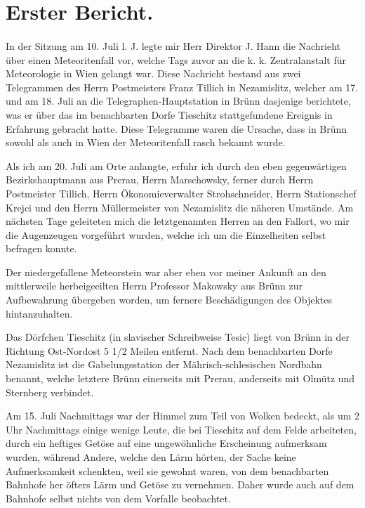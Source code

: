 \documentclass[a4paper, 11pt, oneside]{article}
\begin{document}
\section{Erster Bericht.}
\paragraph{}
In der Sitzung am 10. Juli l. J. legte mir Herr Direktor J. Hann die Nachrieht über einen Meteoritenfall vor, welche Tags zuvor an die k. k. Zentralanstalt für Meteorologie in Wien gelangt war. Diese Nachricht bestand aus zwei Telegrammen des Herrn Postmeisters Franz Tillich in Nezamislitz, welcher am 17. und am 18. Juli an die Telegraphen-Hauptstation in Brünn dasjenige berichtete, was er über das im benachbarten Dorfe Tieschitz stattgefundene Ereignis in Erfahrung gebracht hatte. Diese Telegramme waren die Ursache, dass in Brünn sowohl als auch in Wien der Meteoritenfall rasch bekannt wurde.

Als ich am 20. Juli am Orte anlangte, erfuhr ich durch den eben gegenwärtigen Bezirkshauptmann aus Prerau, Herrn Marschowsky, ferner durch Herrn Postmeister Tillich, Herrn Ökonomieverwalter Strohschneider, Herrn Stationschef Krejci und den Herrn Müllermeister von Nezamislitz die näheren Umstände. Am nächsten Tage geleiteten mich die letztgenannten Herren an den Fallort, wo mir die Augenzeugen vorgeführt wurden, welche ich um die Einzelheiten selbst befragen konnte.

Der niedergefallene Meteorstein war aber eben vor meiner Ankunft an den mittlerweile herbeigeeilten Herrn Professor Makowsky aus Brünn zur Aufbewahrung übergeben worden, um fernere Beschädigungen des Objektes hintanzuhalten.

Das Dörfchen Tieschitz (in slavischer Schreibweise Tesic) liegt von Brünn in der Richtung Ost-Nordost 5 1/2 Meilen entfernt. Nach dem benachbarten Dorfe Nezamislitz ist die Gabelungsstation der Mährisch-schlesischen Nordbahn benannt, welche letztere Brünn einerseits mit Prerau, anderseits mit Olmütz und Sternberg verbindet.

Am 15. Juli Nachmittags war der Himmel zum Teil von Wolken bedeckt, als um 2 Uhr Nachmittags einige wenige Leute, die bei Tieschitz auf dem Felde arbeiteten, durch ein heftiges Getöse auf eine ungewöhnliche Erscheinung aufmerksam wurden, während Andere, welche den Lärm hörten, der Sache keine Aufmerksamkeit schenkten, weil sie gewohnt waren, von dem benachbarten Bahnhofe her öfters Lärm und Getöse zu vernehmen. Daher wurde auch auf dem Bahnhofe selbst nichts von dem Vorfalle beobachtet.
\end{document}
